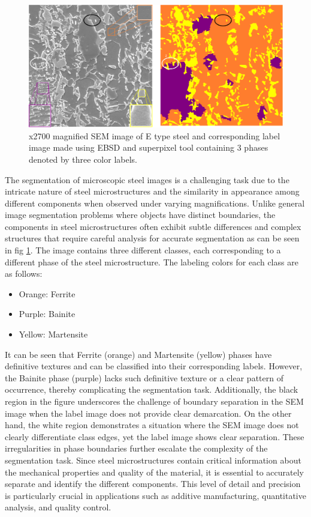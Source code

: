 \documentclass[]{article}
\begin{document}
\begin{figure}[ht]
	\centering
	\includegraphics[width=\textwidth]{images/sem-explain2.png}
	\caption{x2700 magnified SEM image of E type steel and corresponding label image made using EBSD and superpixel tool containing 3 phases denoted by three color labels.}
	\label{fig:image-explain}
\end{figure}

The segmentation of microscopic steel images is a challenging task due to the intricate nature of steel microstructures and the similarity in appearance among different components when observed under varying magnifications. Unlike general image segmentation problems where objects have distinct boundaries, the components in steel microstructures often exhibit subtle differences and complex structures that require careful analysis for accurate segmentation \cite{NIPS2012_imagenet} as can be seen in fig \ref{fig:image-explain}. The image contains three different classes, each corresponding to a different phase of the steel microstructure. The labeling colors for each class are as follows:
\begin{itemize}
	\item Orange: Ferrite
	\item Purple: Bainite
	\item Yellow: Martensite
\end{itemize}
 It can be seen that Ferrite (orange) and Martensite (yellow) phases have definitive textures and can be classified into their corresponding labels. However, the Bainite phase (purple) lacks such definitive texture or a clear pattern of occurrence, thereby complicating the segmentation task. Additionally, the black region in the figure underscores the challenge of boundary separation in the SEM image when the label image does not provide clear demarcation. On the other hand, the white region demonstrates a situation where the SEM image does not clearly differentiate class edges, yet the label image shows clear separation. These irregularities in phase boundaries further escalate the complexity of the segmentation task. Since steel microstructures contain critical information about the mechanical properties and quality of the material, it is essential to accurately separate and identify the different components. This level of detail and precision is particularly crucial in applications such as additive manufacturing, quantitative analysis, and quality control.
\end{document}
